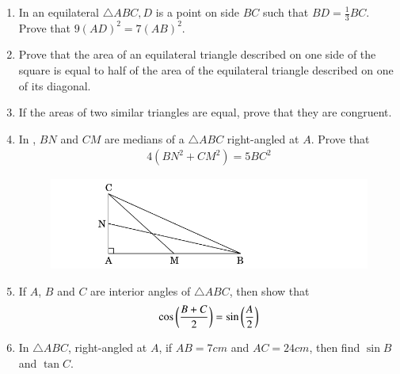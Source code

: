 \begin{enumerate}
	\item In an equilateral $\triangle ABC, D$ is a point on side $BC$ such that $ BD =\frac{1}{3}BC$. Prove that $9(AD)^2 = 7(AB)^2$.
	\hfill{}
\item Prove that the area of an equilateral triangle described on one side of the square is equal to half of the area of the equilateral triangle described on one of its diagonal.
	\hfill{}\item If the areas of two similar triangles are equal, prove that they are congruent.
\hfill{}
\item In , $BN$ and $CM$ are medians of a $\triangle ABC$ right-angled at $A$. Prove that \begin{align*}4(BN^2 +CM^2) = 5BC^2\end{align*} 
\begin{figure}[H]
\centering
\includegraphics[width=\columnwidth]{cbse/figs/rightangled}
\caption{}
\label{fig:rightangled4}
\end{figure}
%
\hfill{}\item If $A$, $B$ and $C$ are interior angles of $ \triangle ABC$, then show that
	\begin{align*}
	    \cos \left(\frac{B + C}{2}\right)=\sin \left(\frac{A}{2}\right)
	\end{align*}
%      
\hfill{} 
\item  In $\triangle ABC$, right-angled at $A$, if $AB=7 cm$ and $AC=24 cm$, then find $\sin B$
and $\tan C$.
%


\end{enumerate}
